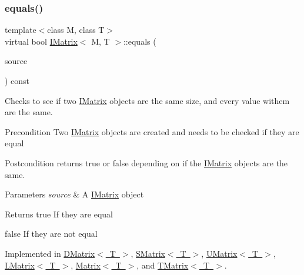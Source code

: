 \mbox{\label{class_i_matrix_afa03122ed7ddb531656ce27690f8fb03}} 
\subsubsection{\texorpdfstring{equals()}{equals()}}
{\footnotesize\ttfamily template$<$class M, class T$>$ \\
virtual bool \mbox{\hyperlink{class_i_matrix}{I\+Matrix}}$<$ M, T $>$\+::equals (\begin{DoxyParamCaption}\item[{const \mbox{\hyperlink{class_i_matrix}{I\+Matrix}}$<$ M, T $>$ \&}]{source }\end{DoxyParamCaption}) const\hspace{0.3cm}{\ttfamily [pure virtual]}}



Checks to see if two \mbox{\hyperlink{class_i_matrix}{I\+Matrix}} objects are the same size, and every value withem are the same. 

\begin{DoxyPrecond}{Precondition}
Two \mbox{\hyperlink{class_i_matrix}{I\+Matrix}} objects are created and needs to be checked if they are equal 
\end{DoxyPrecond}
\begin{DoxyPostcond}{Postcondition}
returns true or false depending on if the \mbox{\hyperlink{class_i_matrix}{I\+Matrix}} objects are the same.
\end{DoxyPostcond}

\begin{DoxyParams}{Parameters}
{\em source} & A \mbox{\hyperlink{class_i_matrix}{I\+Matrix}} object \\
\hline
\end{DoxyParams}
\begin{DoxyReturn}{Returns}
true If they are equal 

false If they are not equal 
\end{DoxyReturn}


Implemented in \mbox{\hyperlink{class_d_matrix_a8a8826ba4911a6a8ec3c0fe2f2d494df}{D\+Matrix$<$ T $>$}}, \mbox{\hyperlink{class_s_matrix_a72278dbea16105244b01d1793a405789}{S\+Matrix$<$ T $>$}}, \mbox{\hyperlink{class_u_matrix_a2d9385b4b327a287d76456b105d9d3b7}{U\+Matrix$<$ T $>$}}, \mbox{\hyperlink{class_l_matrix_a9b8f4a8601992ef29f01dc29165afb7d}{L\+Matrix$<$ T $>$}}, \mbox{\hyperlink{class_matrix_a7bdfaca00fd65171656fd45bdaa6b2a0}{Matrix$<$ T $>$}}, and \mbox{\hyperlink{class_t_matrix_adf09f7a3051afe14137e6abf075cb42e}{T\+Matrix$<$ T $>$}}.


